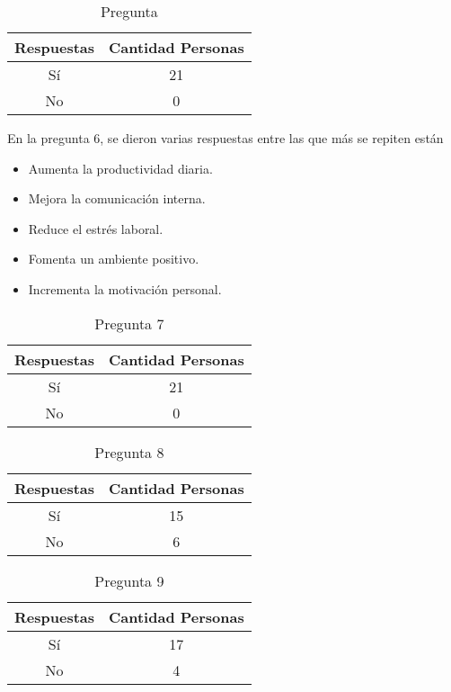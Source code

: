 \begin{enumerate}
\begin{table}
	\caption{Pregunta \thetable\label{pregunta5}}
\begin{tabular}{cc}
\hline
Respuestas & Cantidad Personas\\
\hline
S\'i & 21\\
No & 0\\
\hline
\end{tabular}
\end{table}
En la pregunta 6, se dieron varias respuestas entre las que más se repiten están
\begin{itemize}
\item Aumenta la productividad diaria. 
\item Mejora la comunicación interna. 
\item Reduce el estrés laboral. 
\item Fomenta un ambiente positivo. 
\item Incrementa la motivación personal.
\end{itemize}
\begin{table}
	\caption{Pregunta 7\label{pregunta7}}
\begin{tabular}{cc}
\hline
Respuestas & Cantidad Personas\\
\hline
S\'i & 21\\
No & 0\\
\hline
\end{tabular}
\end{table}
\begin{table}
	\caption{Pregunta 8\label{pregunta8}}
\begin{tabular}{cc}
\hline
Respuestas & Cantidad Personas\\
\hline
S\'i & 15\\
No & 6\\
\hline
\end{tabular}
\end{table}
\begin{table}
	\caption{Pregunta 9\label{pregunta9}}
\begin{tabular}{cc}
\hline
Respuestas & Cantidad Personas\\
\hline
S\'i & 17\\
No & 4\\
\hline
\end{tabular}
\end{table}
\end{enumerate}
